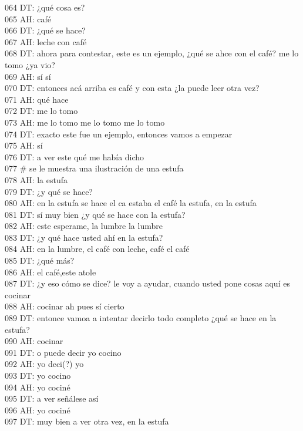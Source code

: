 064 DT: ¿qué cosa es?\\
065 AH: café\\
066 DT: ¿qué se hace?\\
067 AH: leche con café\\
068 DT: ahora para contestar, este es un ejemplo, ¿qué se ahce con el café? me lo tomo ¿ya vio?\\
069 AH: sí sí\\
070 DT: entonces acá arriba es café y con esta ¿la puede leer otra vez?\\
071 AH: qué hace\\
072 DT: me lo tomo\\
073 AH: me lo tomo me lo tomo me lo tomo\\
074 DT: exacto este fue un ejemplo, entonces vamos a empezar\\
075 AH: sí\\
076 DT: a ver este qué me había dicho\\
077 # se le muestra una ilustración de una estufa\\
078 AH: la estufa\\
079 DT: ¿y qué se hace?\\
080 AH: en la estufa se hace el ca estaba el café la estufa, en la estufa\\
081 DT: sí muy bien ¿y qué se hace con la estufa?\\
082 AH: este esperame, la lumbre la lumbre\\
083 DT: ¿y qué hace usted ahí en la estufa?\\
084 AH: en la lumbre, el café con leche, café el café\\
085 DT: ¿qué más?\\
086 AH: el café,este atole\\
087 DT: ¿y eso cómo se dice? le voy a ayudar, cuando usted pone cosas aquí es cocinar\\
088 AH: cocinar ah pues sí cierto\\
089 DT: entonce vamoa a intentar decirlo todo completo ¿qué se hace en la estufa?\\
090 AH: cocinar\\
091 DT: o puede decir yo cocino\\
092 AH: yo deci(?) yo\\
093 DT: yo cocino\\
094 AH: yo cociné\\
095 DT: a ver señálese así\\
096 AH: yo cociné\\
097 DT: muy bien a ver otra vez, en la estufa\\
